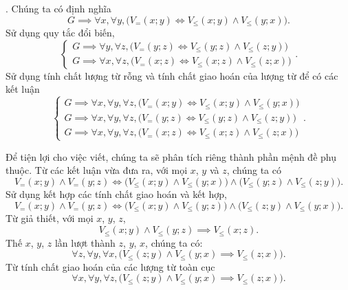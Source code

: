 . Chúng ta có định nghĩa
\begin{equation*}
   G \implies \forall x, \forall y, \big(V_=(x; y) \iff V_\le(x; y) \land V_\le(y; x)\big).
\end{equation*}
Sử dụng quy tắc đổi biến,
\begin{equation*}
    \begin{cases}
        G \implies \forall y, \forall z, \big(V_=(y; z) \iff V_\le(y; z) \land V_\le(z; y)\big) \\
        G \implies \forall x, \forall z, \big(V_=(x; z) \iff V_\le(x; z) \land V_\le(z; x)\big) 
    \end{cases}.
\end{equation*}
Sử dụng tính chất lượng từ rỗng và tính chất giao hoán của lượng từ để có các kết luận
\begin{equation}
    \begin{cases}
        G \implies \forall x, \forall y, \forall z, \big(V_=(x; y) \iff V_\le(x; y) \land V_\le(y; x)\big) \\
        G \implies \forall x, \forall y, \forall z, \big(V_=(y; z) \iff V_\le(y; z) \land V_\le(z; y)\big) \\
        G \implies \forall x, \forall y, \forall z, \big(V_=(x; z) \iff V_\le(x; z) \land V_\le(z; x)\big) 
    \end{cases}.
    \label{eq:nen_tang_lo_gich:giai_tich_vi_tu_bac_nhat:quy_tac_suy_luan:3_1}
\end{equation}

Để tiện lợi cho việc viết, chúng ta sẽ phân tích riêng thành phần mệnh đề phụ thuộc. Từ các kết luận vừa đưa ra, với mọi $x$, $y$ và $z$, chúng ta có
\begin{equation*}
    V_=(x; y) \land V_=(y; z) \iff \big(V_\le(x; y) \land V_\le(y; x)\big) \land \big(V_\le(y; z) \land V_\le(z; y)\big).
\end{equation*}
Sử dụng kết hợp các tính chất giao hoán và kết hợp,
\begin{equation}
    V_=(x; y) \land V_=(y; z) \iff \big(V_\le(x; y) \land V_\le(y; z)\big) \land \big(V_\le(z; y) \land V_\le(y; x)\big).
    \label{eq:nen_tang_lo_gich:giai_tich_vi_tu_bac_nhat:quy_tac_suy_luan:3_2}
\end{equation}
Từ giả thiết, với mọi $x$, $y$, $z$,
\begin{equation}
    V_\le(x; y) \land V_\le(y; z) \implies V_\le(x; z).
    \label{eq:nen_tang_lo_gich:giai_tich_vi_tu_bac_nhat:quy_tac_suy_luan:3_3}
\end{equation}
Thế $x$, $y$, $z$ lần lượt thành $z$, $y$, $x$, chúng ta có:
\begin{equation*}
    \forall z, \forall y, \forall x, \big(V_\le(z; y) \land V_\le(y; x) \implies V_\le(z; x)\big).
\end{equation*}
Từ tính chất giao hoán của các lượng từ toàn cục
\begin{equation}
    \forall x, \forall y, \forall z, \big(V_\le(z; y) \land V_\le(y; x) \implies V_\le(z; x)\big).
    \label{eq:nen_tang_lo_gich:giai_tich_vi_tu_bac_nhat:quy_tac_suy_luan:3_4}
\end{equation}

